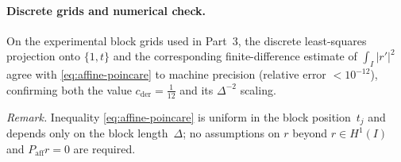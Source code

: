 \paragraph{Discrete grids and numerical check.}
On the experimental block grids used in Part~3, the discrete least-squares projection
onto $\{1,t\}$ and the corresponding finite-difference estimate of $\int_I |r'|^2$
agree with \eqref{eq:affine-poincare} to machine precision (relative error $<10^{-12}$),
confirming both the value $c_{\mathrm{der}}=\tfrac{1}{12}$ and its $\Delta^{-2}$ scaling.

\medskip
\noindent
\emph{Remark.}
Inequality \eqref{eq:affine-poincare} is uniform in the block position~$t_j$
and depends only on the block length~$\Delta$; no assumptions on $r$ beyond
$r\in H^1(I)$ and $P_{\mathrm{aff}} r=0$ are required.
